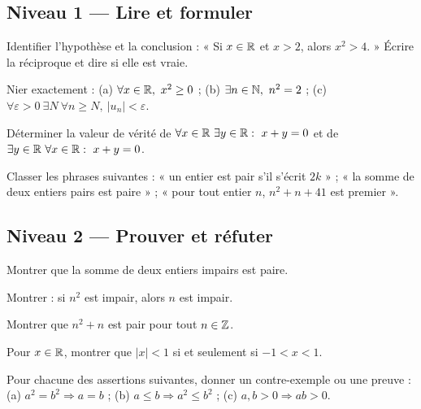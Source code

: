 \subsection*{Niveau 1 — Lire et formuler}
\begin{exercice}\label{ex:log:1}
Identifier l'hypothèse et la conclusion : « Si $x\in\mathbb R$ et $x>2$, alors $x^2>4$. » Écrire la réciproque et dire si elle est vraie.
\end{exercice}
\begin{exercice}[Négations]\label{ex:log:2}
Nier exactement : (a) $\forall x\in\mathbb R,\ x^2\ge0$ ; (b) $\exists n\in\mathbb N,\ n^2=2$ ; (c) $\forall\varepsilon>0\ \exists N\ \forall n\ge N,\ |u_n|<\varepsilon$.
\end{exercice}
\begin{exercice}[Quantificateurs]\label{ex:log:3}
Déterminer la valeur de vérité de $\forall x\in\R\ \exists y\in\R:\ x+y=0$ et de $\exists y\in\mathbb R\ \forall x\in\mathbb R:\ x+y=0$.
\end{exercice}
\begin{exercice}\label{ex:log:4}
Classer les phrases suivantes : « un entier est pair s'il s'écrit $2k$ » ; « la somme de deux entiers pairs est paire » ; « pour tout entier $n$, $n^2+n+41$ est premier ».
\end{exercice}
\subsection*{Niveau 2 — Prouver et réfuter}
\begin{exercice}\label{ex:log:5}
Montrer que la somme de deux entiers impairs est paire.
\end{exercice}
\begin{exercice}[Contraposée]\label{ex:log:6}
Montrer : si $n^2$ est impair, alors $n$ est impair.
\end{exercice}
\begin{exercice}\label{ex:log:7}
Montrer que $n^2+n$ est pair pour tout $n\in\mathbb Z$.
\end{exercice}
\begin{exercice}[Équivalence]\label{ex:log:8}
Pour $x\in\mathbb R$, montrer que $|x|<1$ si et seulement si $-1<x<1$.
\end{exercice}
\begin{exercice}\label{ex:log:9}
Pour chacune des assertions suivantes, donner un contre-exemple ou une preuve : (a) $a^2=b^2\Rightarrow a=b$ ; (b) $a\le b\Rightarrow a^2\le b^2$ ; (c) $a,b>0\Rightarrow ab>0$.
\end{exercice}
